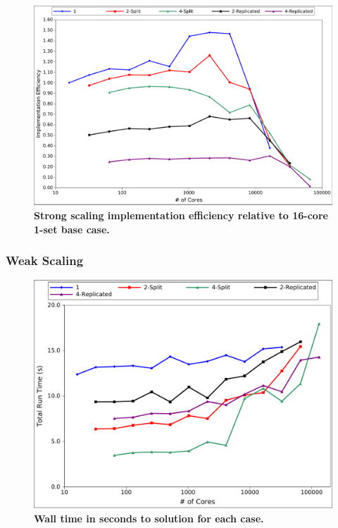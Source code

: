 \begin{figure}[t!]
  \begin{center}
    \includegraphics[width=6in]{chapters/parallel_mc/titan_strong_ms_impeff.pdf}
  \end{center}
  \caption{\textbf{Strong scaling implementation efficiency relative
      to 16-core 1-set base case.}}
  \label{fig:titan_strong_ms_impeff}
\end{figure}

\clearpage

\subsubsection{Weak Scaling}
\label{subsubsec:msod_weak}

\begin{figure}[t!]
  \begin{center}
    \includegraphics[width=6in]{chapters/parallel_mc/titan_weak_ms_time.pdf}
  \end{center}
  \caption{\textbf{Wall time in seconds to solution for each case.}}
  \label{fig:titan_weak_ms_time}
\end{figure}

